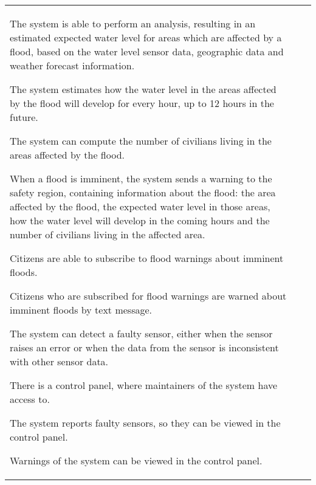 \begin{longtable}{L{0.1\textwidth} L{0.12\textwidth} L{0.78\textwidth}}
			    
	{ The system is able to perform an analysis, resulting in an estimated expected water level for areas which are affected by a flood, based on the water level sensor data, geographic data and weather forecast information. }
			    
	{ The system estimates how the water level in the areas affected by the flood will develop for every hour, up to 12 hours in the future. } %
			    
	{ The system can compute the number of civilians living in the areas affected by the flood. }
			    
	{ When a flood is imminent, the system sends a warning to the safety region, containing information about the flood: the area affected by the flood, the expected water level in those areas, how the water level will develop in the coming hours and the number of civilians living in the affected area. }
			    
	{ Citizens are able to subscribe to flood warnings about imminent floods. }
			    
	{ Citizens who are subscribed for flood warnings are warned about imminent floods by text message. }
				
	{ The system can detect a faulty sensor, either when the sensor raises an error or when the data from the sensor is inconsistent with other sensor data. }
			    
	{ There is a control panel, where maintainers of the system have access to. }  %
			    
	{ The system reports faulty sensors, so they can be viewed in the control panel. }
			    
	{ Warnings of the system can be viewed in the control panel. }
			

\end{longtable}
